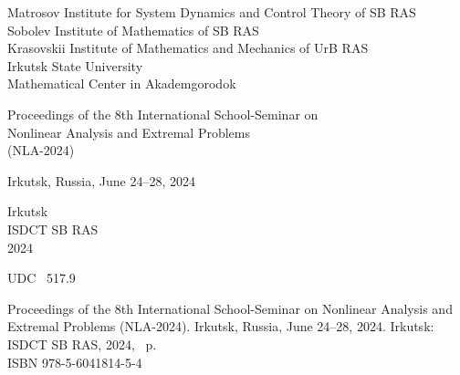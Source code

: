 \documentclass[12pt,final]{llncs}
\begin{document}
%
%
\frontmatter          %
\setcounter{page}{1}
%
%

\begin{center}
{\bf
  \thispagestyle{empty}
  \pagestyle{fancy}

   	Matrosov Institute for System Dynamics and Control Theory of  SB RAS\\[0.3em]

 	Sobolev Institute of Mathematics  of SB RAS\\[0.3em]

  Krasovskii Institute of Mathematics and Mechanics of UrB RAS\\[0.3em]

 	Irkutsk State University\\[0.3em]
 	Mathematical Center in Akademgorodok
 	  }


\vfill

{  \Large Proceedings of the 8th International School-Seminar on\\[0.3em]

Nonlinear Analysis and Extremal Problems\\[0.3em]

  (NLA-2024)\\[0.2em] }

{\Large  Irkutsk, Russia, June 24--28, 2024 }

\vfill
\vfill



Irkutsk\\
ISDCT SB RAS\\
2024

\end{center}

\newpage

\thispagestyle{empty}
\noindent{}UDC \ 517.9

 \vspace{3cm}

Proceedings of the 8th International School-Seminar on Nonlinear
Analysis and Extremal Problems  (NLA-2024). Irkutsk, Russia, June 24--28, 2024. Irkutsk\;:
ISDCT SB RAS, 2024, \pageref{LastPage}~p.\\
ISBN 978-5-6041814-5-4

 \vspace{1cm}
\end{document}
